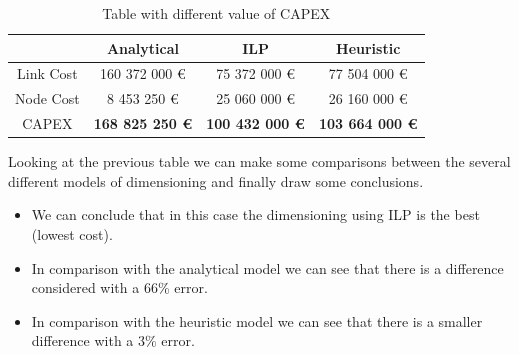 \begin{table}[h!]
\centering
\begin{tabular}{| c | c | c | c |}
 \hline
   & Analytical & ILP & Heuristic \\
 \hline\hline
 Link Cost & 160 372 000 \euro & 75 372 000 \euro & 77 504 000 \euro \\
 Node Cost & 8 453 250 \euro & 25 060 000 \euro & 26 160 000 \euro \\
 CAPEX & \textbf{168 825 250 \euro} & \textbf{100 432 000 \euro} & \textbf{103 664 000 \euro} \\
 \hline
\end{tabular}
\caption{Table with different value of CAPEX }
\label{table_comparative_opaque_sur_ref_2}
\end{table}

\vspace{11pt}
Looking at the previous table we can make some comparisons between the several different models of dimensioning and finally draw some conclusions.

\begin{itemize}
  \item We can conclude that in this case the dimensioning using ILP is the best (lowest cost).
  \item In comparison with the analytical model we can see that there is a difference considered with a 66\% error.
  \item In comparison with the heuristic model we can see that there is a smaller difference with a 3\% error.
\end{itemize}

